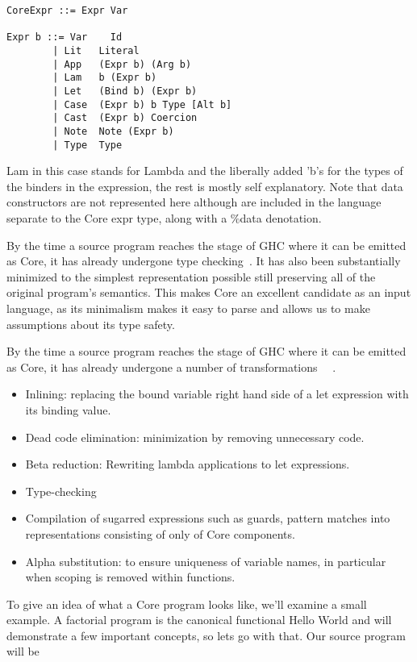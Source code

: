 \begin{verbatim}
CoreExpr ::= Expr Var

Expr b ::= Var	  Id
        | Lit   Literal
        | App   (Expr b) (Arg b)
        | Lam   b (Expr b)
        | Let   (Bind b) (Expr b)
        | Case  (Expr b) b Type [Alt b]
        | Cast  (Expr b) Coercion
        | Note  Note (Expr b)
        | Type  Type
\end{verbatim}

\noindent Lam in this
case stands for Lambda and the liberally added 'b's for the types of the binders
in the expression, the rest is mostly self explanatory. Note that data constructors
are not represented here although are included in the language separate to the
Core expr type, along with a \%data denotation.

By the time a source program reaches the stage of GHC where it can be emitted
as Core, it has already undergone type checking~\cite{Inliner}. It has also 
been substantially minimized to the simplest representation
possible still preserving all of the original program's semantics. This makes
Core an excellent candidate as an input language, as its minimalism makes it
easy to parse and allows us to make assumptions about its type safety.

By the time a source program reaches the stage of GHC where it can be emitted
as Core, it has already undergone a number of transformations~\cite[pp.5]{Inliner}
~\cite{Ext-Core}. 

\begin{itemize}
  \item Inlining: replacing the bound variable right hand side of a let expression
        with its binding value.
  \item Dead code elimination: minimization by removing unnecessary code.
  \item Beta reduction: Rewriting lambda applications to let expressions.
  \item Type-checking
  \item Compilation of sugarred expressions such as guards, pattern matches
        into representations consisting of only of Core components.
  \item Alpha substitution: to ensure uniqueness of variable names, in particular
        when scoping is removed within functions.
\end{itemize}

To give an idea of what a Core program looks like, we'll examine a small 
example. A factorial program is the canonical functional Hello World and will
demonstrate a few important concepts, so lets go with that. Our source program
will be 

